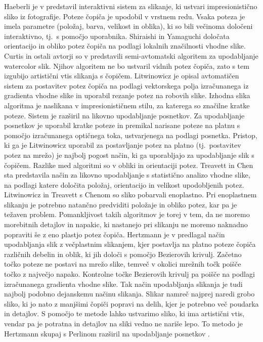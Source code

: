 Haeberli je v \cite{Haeberli:PaintNumbers} predstavil interaktivni sistem za slikanje, ki ustvari impresionistično sliko iz fotografije. Poteze čopiča je upodobil v vrstnem redu. Vsaka poteza je imela parametre (položaj, barva, velikost in oblika), ki so bili večinoma določeni interaktivno, tj.\ s pomočjo uporabnika. Shiraishi in Yamaguchi \cite{Shiraishi:LocalSource} določata orientacijo in obliko potez čopiča na podlagi lokalnih značilnosti vhodne slike. Curtis in ostali avtorji so v \cite{Curtis:Watercolor} predstavili semi-avtomatski algoritem za upodabljanje watercolor slik. %
Njihov algoritem ne bo ustvaril vidnih potez čopiča, zato s tem izgubijo artistični vtis slikanja s čopičem. Litwinowicz \cite{Litwinowicz:VideoImpressionist} je opisal avtomatičen sistem za postavitev potez čopiča na podlagi vektorskega polja izračunanega iz gradienta vhodne slike in uporabil rezanje potez na robovih slike. Izhodna slika algoritma je naslikana v impresionističnem stilu, za katerega so značilne kratke poteze. %
Sistem je razširil na likovno upodabljanje posnetkov. Za upodabljanje posnetkov je uporabil kratke poteze in premikal narisane poteze na platnu s pomočjo izračunanega optičnega toka, ustvarjenega na podlagi posnetka. Pristop, ki ga je Litwinowicz uporabil za postavljanje potez na platno (tj.\ postavitev potez na mrežo) je najbolj pogost način, ki ga uporabljajo za upodabljanje slik s čopičem. Razlike med algoritmi so v obliki in orientaciji potez. Treavett in Chen \cite{Treavett:Statistical} sta predstavila način za likovno upodabljanje s statistično analizo vhodne slike, na podlagi katere določita položaj, orientacijo in velikost upodobljenih potez. Litwinowicz in Treavett s Chenom so sliko pobarvali enoplastno. Pri enoplastnem slikanju je potrebno natančno predviditi položaje in obliko potez, kar pa je težaven problem. Pomankljivost takih algoritmov je torej v tem, da ne moremo morebitnih detajlov in napakic, ki nastanejo pri slikanju ne moremo naknadno popraviti še z eno plastjo potez čopiča. Hertzmann je v \cite{Hertzmann:BrushStrokes} predlagal način upodabljanja slik z večplastnim slikanjem, kjer postavlja na platno poteze čopiča različnih debelin in oblik, ki jih določi s pomočjo Bezierovih krivulj. Začetno točko poteze ne postavi na mrežo slike, temveč v okolici mrežnih točk poišče točko z največjo napako. Kontrolne točke Bezierovih krivulj pa poišče na podlagi izračunanega gradienta vhodne slike. Tak način upodabljanja slikanja je tudi najbolj podobno dejanskemu načinu slikanja. Slikar namreč najprej naredi grobo sliko, ki jo nato z manjšimi čopiči popravi na delih, kjer je potrebno več poudarka in detajlov. S pomočjo te metode lahko ustvarimo sliko, ki ima artistični vtis, vendar pa je potratna in detajlov na sliki vedno ne nariše lepo. To metodo je Hertzmann skupaj s Perlinom razširil na upodabljanje posnetkov \cite{Hertzmann:Video}.

